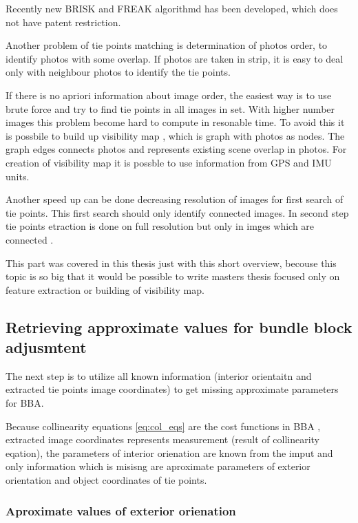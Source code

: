 \documentclass[a4paper,12pt]{report}
\begin{document}
Recently new BRISK \cite{leutenegger2011brisk} and FREAK \cite{alahi2012freak} algorithmd 
has been developed, which does not have patent restriction. 

Another problem of tie points matching is determination of photos order, to identify photos with some overlap. 
If photos are taken in strip, it is easy to deal only with neighbour photos to identify the tie points.

If there is no apriori information about image order, the easiest way is to use brute force and 
try to find tie points in all images in set. With higher number images this problem become 
hard to compute in resonable time. To avoid this it is possbile to build up visibility map \cite{barazzetti2010extraction}, 
which is graph with photos as nodes. The graph edges connects photos and represents existing scene overlap 
in photos. For creation of visibility map it is possble to use information from GPS and IMU units.

Another speed up can be done decreasing resolution of images 
for first search of tie points. This first search should only identify connected images.
In second step tie points etraction is done on full resolution but only in imges which 
are connected .

This part was covered in this thesis just with this short overview, becouse this topic is so big 
that it would be possible to write masters thesis focused only on feature extraction or building 
of visibility map.


\subsection{Retrieving approximate values for bundle block adjusmtent}


The next step is to utilize all known information (interior orientaitn and extracted 
tie points image coordinates)  to get missing approximate parameters for BBA. 

Because collinearity equations \ref{eq:col_eqs} are the cost functions in BBA ,
extracted image coordinates represents measurement (result of collinearity eqation),
the parameters of interior orienation are known from the imput and only information 
which is misisng are aproximate parameters of exterior orientation and object coordinates of 
tie points. 

\subsubsection{Aproximate values of exterior orienation}
\end{document}
